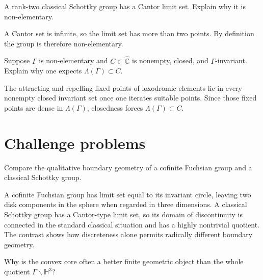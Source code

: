 \begin{problem}\label{prob:vii37-11}
A rank-two classical Schottky group has a Cantor limit set.  Explain why it is non-elementary.
\end{problem}

\begin{solution}
A Cantor set is infinite, so the limit set has more than two points.  By definition the group is therefore non-elementary.
\end{solution}

\begin{problem}\label{prob:vii37-12}
Suppose \(\Gamma\) is non-elementary and \(C\subset\widehat{\mathbb C}\) is nonempty, closed, and \(\Gamma\)-invariant.  Explain why one expects \(\Lambda(\Gamma)\subset C\).
\end{problem}

\begin{solution}
The attracting and repelling fixed points of loxodromic elements lie in every nonempty closed invariant set once one iterates suitable points.  Since those fixed points are dense in \(\Lambda(\Gamma)\), closedness forces \(\Lambda(\Gamma)\subset C\).
\end{solution}

\section{Challenge problems}

\begin{problem}\label{prob:vii37-ch01}
Compare the qualitative boundary geometry of a cofinite Fuchsian group and a classical Schottky group.
\end{problem}

\begin{solution}
A cofinite Fuchsian group has limit set equal to its invariant circle, leaving two disk components in the sphere when regarded in three dimensions.  A classical Schottky group has a Cantor-type limit set, so its domain of discontinuity is connected in the standard classical situation and has a highly nontrivial quotient.  The contrast shows how discreteness alone permits radically different boundary geometry.
\end{solution}

\begin{problem}\label{prob:vii37-ch02}
Why is the convex core often a better finite geometric object than the whole quotient \(\Gamma\backslash\mathbb H^3\)?
\end{problem}

